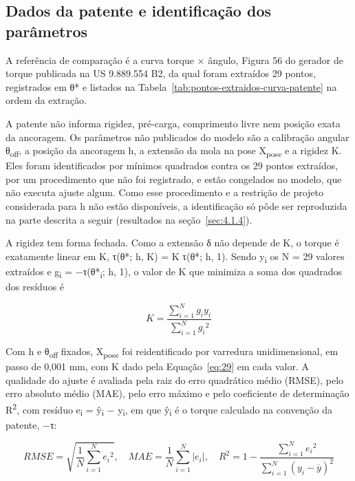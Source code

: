 \subsection{Dados da patente e identificação dos parâmetros}\label{sec:3.1.10}

A referência de comparação é a curva torque × ângulo, Figura 56 do gerador de torque publicada na US 9.889.554 B2, da qual foram extraídos 29 pontos, registrados em θ* e listados na Tabela~\ref{tab:pontos-extraidos-curva-patente} na ordem da extração.

A patente não informa rigidez, pré-carga, comprimento livre nem posição exata da ancoragem. Os parâmetros não publicados do modelo são a calibração angular θ\textsubscript{off}, a posição da ancoragem h, a extensão da mola na pose X\textsubscript{pose} e a rigidez K. Eles foram identificados por mínimos quadrados contra os 29 pontos extraídos, por um procedimento que não foi registrado, e estão congelados no modelo, que não executa ajuste algum. Como esse procedimento e a restrição de projeto considerada para h não estão disponíveis, a identificação só pôde ser reproduzida na parte descrita a seguir (resultados na seção~\ref{sec:4.1.4}).

A rigidez tem forma fechada. Como a extensão δ não depende de K, o torque é exatamente linear em K, τ(θ*; h, K) = K τ(θ*; h, 1). Sendo y\textsubscript{i} os N = 29 valores extraídos e g\textsubscript{i} = −τ(θ*\textsubscript{i}; h, 1), o valor de K que minimiza a soma dos quadrados dos resíduos é

\begin{equation}
  K = \frac{\sum_{i = 1}^{N}{g_{i}y_{i}}}{\sum_{i = 1}^{N}{g_{i}}^{2}}
  \label{eq:29}
\end{equation}

Com h e θ\textsubscript{off} fixados, X\textsubscript{pose} foi reidentificado por varredura unidimensional, em passo de 0,001 mm, com K dado pela Equação~\eqref{eq:29} em cada valor. A qualidade do ajuste é avaliada pela raiz do erro quadrático médio (RMSE), pelo erro absoluto médio (MAE), pelo erro máximo e pelo coeficiente de determinação R\textsuperscript{2}, com resíduo e\textsubscript{i} = ŷ\textsubscript{i} − y\textsubscript{i}, em que ŷ\textsubscript{i} é o torque calculado na convenção da patente, −τ:

\begin{equation}
  RMSE = \sqrt{\frac{1}{N}\sum_{i = 1}^{N}{e_{i}}^{2}},\quad MAE = \frac{1}{N}\sum_{i = 1}^{N}\left| e_{i} \right|,\quad R^{2} = 1 - \frac{\sum_{i = 1}^{N}{e_{i}}^{2}}{\sum_{i = 1}^{N}{(y_{i} - \overline{y})}^{2}}
  \label{eq:30}
\end{equation}

